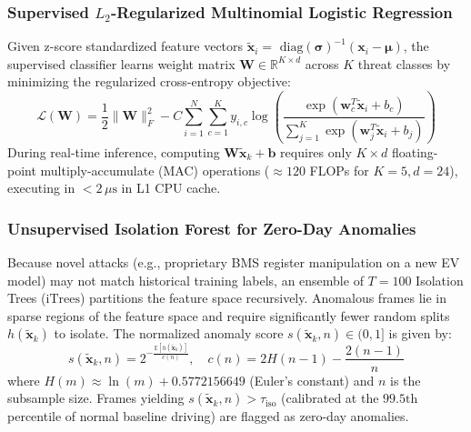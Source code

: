 \documentclass[conference]{IEEEtran}
\begin{document}
\subsubsection{Supervised $L_2$-Regularized Multinomial Logistic Regression}
Given z-score standardized feature vectors $\tilde{\mathbf{x}}_i = \text{ diag}(\boldsymbol{\sigma})^{-1}(\mathbf{x}_i - \boldsymbol{\mu})$, the supervised classifier learns weight matrix $\mathbf{W} \in \mathbb{R}^{K \times d}$ across $K$ threat classes by minimizing the regularized cross-entropy objective:
\begin{equation}
    \mathcal{L}(\mathbf{W}) = \frac{1}{2} \|\mathbf{W}\|_F^2 - C \sum_{i=1}^{N} \sum_{c=1}^{K} y_{i,c} \log \left( \frac{\exp(\mathbf{w}_c^T \tilde{\mathbf{x}}_i + b_c)}{\sum_{j=1}^{K} \exp(\mathbf{w}_j^T \tilde{\mathbf{x}}_i + b_j)} \right)
\end{equation}
During real-time inference, computing $\mathbf{W}\tilde{\mathbf{x}}_k + \mathbf{b}$ requires only $K \times d$ floating-point multiply-accumulate (MAC) operations ($\approx 120$ FLOPs for $K=5, d=24$), executing in $<2\,\mu\text{s}$ in L1 CPU cache.

\subsubsection{Unsupervised Isolation Forest for Zero-Day Anomalies}
Because novel attacks (e.g., proprietary BMS register manipulation on a new EV model) may not match historical training labels, an ensemble of $T = 100$ Isolation Trees ($\text{iTrees}$) partitions the feature space recursively. Anomalous frames lie in sparse regions of the feature space and require significantly fewer random splits $h(\tilde{\mathbf{x}}_k)$ to isolate. The normalized anomaly score $s(\tilde{\mathbf{x}}_k, n) \in (0, 1]$ is given by:
\begin{equation}
    s(\tilde{\mathbf{x}}_k, n) = 2^{-\frac{\mathbb{E}[h(\tilde{\mathbf{x}}_k)]}{c(n)}}, \quad c(n) = 2 H(n-1) - \frac{2(n-1)}{n}
\end{equation}
where $H(m) \approx \ln(m) + 0.5772156649$ (Euler's constant) and $n$ is the subsample size. Frames yielding $s(\tilde{\mathbf{x}}_k, n) > \tau_{\text{iso}}$ (calibrated at the $99.5\text{th}$ percentile of normal baseline driving) are flagged as zero-day anomalies.
\end{document}
